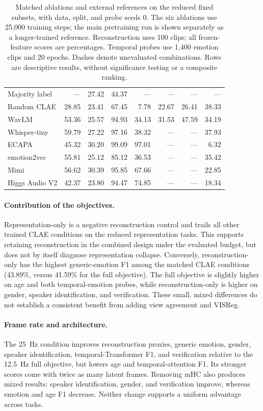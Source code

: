 \documentclass[11pt,a4paper]{article}
\begin{document}
\begin{table}[t]
\begin{tabular}{@{}lrrrrrrr@{}}
\midrule
Majority label & --- & 27.42 & 44.37 & --- & --- & --- & --- \\
Random CLAE & 28.85 & 23.41 & 67.45 & 7.78 & 22.67 & 26.41 & 38.33 \\
WavLM & 53.36 & 25.57 & 94.93 & 34.13 & 31.53 & 47.59 & 34.19 \\
Whisper-tiny & 59.79 & 27.22 & 97.16 & 38.32 & --- & --- & 37.93 \\
ECAPA & 45.32 & 30.20 & 99.09 & 97.01 & --- & --- & 6.32 \\
emotion2vec & 55.81 & 25.12 & 85.12 & 36.53 & --- & --- & 35.42 \\
Mimi & 56.62 & 30.39 & 95.85 & 67.66 & --- & --- & 22.85 \\
Higgs Audio V2 & 42.37 & 23.80 & 94.47 & 74.85 & --- & --- & 18.34 \\
\bottomrule
\end{tabular}
\caption{Matched ablations and external references on the reduced fixed subsets, with data, split, and probe seeds 0. The six ablations use 25,000 training steps; the main pretraining run is shown separately as a longer-trained reference. Reconstruction uses 100 clips; all frozen-feature scores are percentages. Temporal probes use 1,400 emotion clips and 20 epochs. Dashes denote unevaluated combinations. Rows are descriptive results, without significance testing or a composite ranking.}
\label{tab:reduced-fp32-clae}
\end{table}

\paragraph{Contribution of the objectives.}
Representation-only is a negative reconstruction control and trails all other trained CLAE conditions on the reduced representation tasks. This supports retaining reconstruction in the combined design under the evaluated budget, but does not by itself diagnose representation collapse. Conversely, reconstruction-only has the highest generic-emotion F1 among the matched CLAE conditions (43.89\%, versus 41.59\% for the full objective). The full objective is slightly higher on age and both temporal-emotion probes, while reconstruction-only is higher on gender, speaker identification, and verification. These small, mixed differences do not establish a consistent benefit from adding view agreement and VISReg.

\paragraph{Frame rate and architecture.}
The 25~Hz condition improves reconstruction proxies, generic emotion, gender, speaker identification, temporal-Transformer F1, and verification relative to the 12.5~Hz full objective, but lowers age and temporal-attention F1. Its stronger scores come with twice as many latent frames. Removing mHC also produces mixed results: speaker identification, gender, and verification improve, whereas emotion and age F1 decrease. Neither change supports a uniform advantage across tasks.
\end{document}
